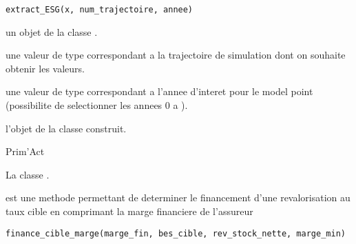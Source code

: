 \documentclass[a4paper]{book}
\begin{document}
%
\begin{Usage}
\begin{verbatim}
extract_ESG(x, num_trajectoire, annee)
\end{verbatim}
\end{Usage}
%
\begin{Arguments}
\begin{ldescription}
\item[\code{x}] un objet de la classe .

\item[\code{num\_trajectoire}] une valeur de type  correspondant a la trajectoire de simulation
dont on souhaite obtenir les valeurs.

\item[\code{annee}] une valeur de type  correspondant a l'annee d'interet pour le model point
(possibilite de selectionner les annees 0 a ).
\end{ldescription}
\end{Arguments}
%
\begin{Value}
 l'objet de la classe  construit.
\end{Value}
%
\begin{Author}\relax
Prim'Act
\end{Author}
%
\begin{SeeAlso}\relax
La classe .
\end{SeeAlso}
%
\begin{Description}\relax
{} est une methode permettant de
determiner le financement d'une revalorisation au taux cible en comprimant la marge financiere
de l'assureur
\end{Description}
%
\begin{Usage}
\begin{verbatim}
finance_cible_marge(marge_fin, bes_cible, rev_stock_nette, marge_min)
\end{verbatim}
\end{Usage}
%
\end{document}
